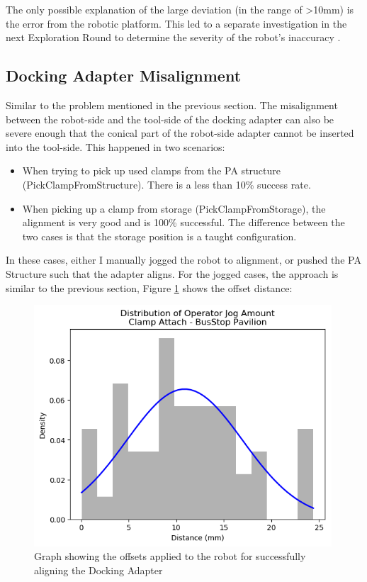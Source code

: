 The only possible explanation of the large deviation (in the range of >10mm) is the error from the robotic platform. This led to a separate investigation in the next Exploration Round to determine the severity of the robot’s inaccuracy .

\subsection{Docking Adapter Misalignment}
\label{subsection:exploration-3-docking-adapter-misalignment}

Similar to the problem mentioned in the previous section. The misalignment between the robot-side and the tool-side of the docking adapter can also be severe enough that the conical part of the robot-side adapter cannot be inserted into the tool-side. This happened in two scenarios:

\begin{itemize}
	\item When trying to pick up used clamps from the PA structure (PickClampFromStructure). There is a less than 10\% success rate.

	\item When picking up a clamp from storage (PickClampFromStorage), the alignment is very good and is 100\% successful. The difference between the two cases is that the storage position is a taught configuration.

\end{itemize}
In these cases, either I manually jogged the robot to alignment, or pushed the PA Structure such that the adapter aligns. For the jogged cases, the approach is similar to the previous section, Figure \ref{fig:offsets-applied-manually-2} shows the offset distance:

\begin{figure}[!h]
    \centering
    \includegraphics[width=0.99\textwidth]{images/6b/img08.png}
    \caption{Graph showing the offsets applied to the robot for successfully aligning the Docking Adapter}
    \label{fig:offsets-applied-manually-2}
\end{figure}

